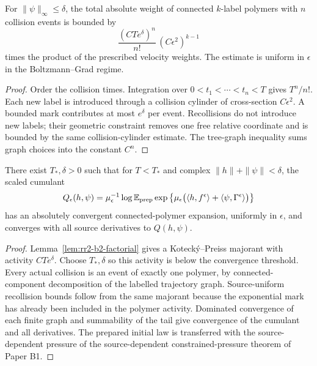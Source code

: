 \begin{lemma}
\label{lem:rr2-b2-factorial}
For \(\|\psi\|_\infty\le\delta\), the total absolute weight of connected
\(k\)-label polymers with \(n\) collision events is bounded by
\[
 \frac{(C T e^{\delta})^n}{n!}\,(C\epsilon^2)^{k-1}
\]
times the product of the prescribed velocity weights.  The estimate is
uniform in \(\epsilon\) in the Boltzmann--Grad regime.
\end{lemma}

\begin{proof}
Order the collision times.  Integration over
\(0<t_1<\cdots<t_n<T\) gives \(T^n/n!\).  Each new label is introduced
through a collision cylinder of cross-section \(C\epsilon^2\).
A bounded mark contributes at most \(e^\delta\) per event.  Recollisions do
not introduce new labels; their geometric constraint removes one free
relative coordinate and is bounded by the same collision-cylinder estimate.
The tree-graph inequality sums graph choices into the constant \(C^n\).
\end{proof}

\begin{theorem}
\label{thm:rr2-b2-cluster}
There exist \(T_*,\delta>0\) such that for \(T<T_*\) and complex
\(\|h\|+\|\psi\|<\delta\), the scaled cumulant
\[
 Q_\epsilon(h,\psi)
 =
 \mu_\epsilon^{-1}
 \log\mathbb E_{\rm prep}
 \exp\left\{\mu_\epsilon
 \big(\langle h,f^\epsilon\rangle+
      \langle\psi,\Gamma^\epsilon\rangle\big)\right\}
\]
has an absolutely convergent connected-polymer expansion, uniformly in
\(\epsilon\), and converges with all source derivatives to
\(Q(h,\psi)\).
\end{theorem}

\begin{proof}
Lemma~\ref{lem:rr2-b2-factorial} gives a Koteck\'y--Preiss majorant with
activity \(CTe^\delta\).  Choose \(T_*,\delta\) so this activity is below the
convergence threshold.  Every actual collision is an event of exactly one
polymer, by connected-component decomposition of the labelled trajectory
graph.  Source-uniform recollision bounds follow from the same majorant
because the exponential mark has already been included in the polymer
activity.  Dominated convergence of each finite graph and summability of the
tail give convergence of the cumulant and all derivatives.
The prepared initial law is transferred with the source-dependent pressure
of the source-dependent constrained-pressure theorem of Paper B1.
\end{proof}

